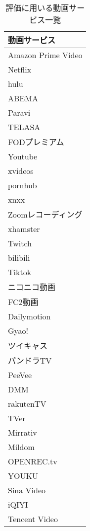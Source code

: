 \begin{table}[htbp]
  \label{tb:evl-video-service-list}
  \caption{評価に用いる動画サービス一覧}
  \begin{center}
    \begin{tabular}{|l|}
    \hline
    動画サービス  \\\hline\hline
    Amazon Prime Video \\ \hline
    Netflix \\ \hline
    hulu \\ \hline
    ABEMA \\ \hline
    Paravi \\ \hline
    TELASA \\ \hline
    FODプレミアム \\ \hline
    Youtube \\ \hline
    xvideos \\ \hline
    pornhub \\ \hline
    xnxx \\ \hline
    Zoomレコーディング \\ \hline
    xhamster \\ \hline
    Twitch \\ \hline
    bilibili \\ \hline
    Tiktok \\ \hline
    ニコニコ動画 \\ \hline
    FC2動画 \\ \hline
    Dailymotion \\ \hline
    Gyao! \\ \hline
    ツイキャス \\ \hline
    パンドラTV \\ \hline
    PeeVee \\ \hline
    DMM \\ \hline
    rakutenTV \\ \hline
    TVer \\ \hline
    Mirrativ \\ \hline
    Mildom \\ \hline
    OPENREC.tv \\ \hline
    YOUKU \\ \hline
    Sina Video \\ \hline
    iQIYI \\ \hline
    Tencent Video \\ \hline
    \end{tabular}
  \end{center}
\end{table}

